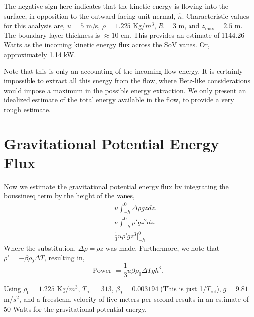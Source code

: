\documentclass{article}
\begin{document}

The negative sign here indicates that the kinetic energy is flowing into
the surface, in opposition to the outward facing unit normal, $\hat
n$. Characteristic values for this analysis are, $u = 5$ m/s, $\rho =
1.225$ Kg/$m^3$, $R = 3$ m, and $z_{\text{max}} = 2.5$ m. The boundary
layer thickness is $\approx 10$ cm. This provides
an estimate of 1144.26 Watts as the incoming kinetic energy flux across
the SoV vanes. Or, approximately 1.14 kW. 

Note that this is only an accounting of the incoming flow energy. It is certainly
impossible to extract all this energy from the flow, where Betz-like considerations 
would impose a maximum in the possible energy extraction. We only present an idealized
estimate of the total energy available in the flow, to provide a very rough estimate.


\section*{Gravitational Potential Energy Flux}


Now we estimate the gravitational potential energy flux by integrating 
the boussinesq term by the height of the vanes, 
\begin{align*}
  & = u \int_{-h}^0 \Delta \rho g z dz. \\
  & = u \int_{-h}^0 \rho' g z^2 dz. \\
  & = \frac{1}{3} u \rho' g z^3 \bigg|_{-h}^{0}
\end{align*}
Where the substitution, $\Delta \rho = \rho z$ was made. Furthermore, we
note that $\rho' = -\beta \rho_0 \Delta T$, resulting in, 
%
%
\begin{equation}
 \text{Power } = \frac{1}{3} u \beta \rho_0 \Delta T g h^3.
\end{equation}

Using $\rho_0 = 1.225$ Kg/$m^3$, $T_{\text{ref}}=313$, $\beta_T = 0.003194$
(This is just 1/$T_{\text{ref}}$), $g=9.81$ m/$s^2$, and a freesteam
velocity of five meters per second results in an
estimate of 50 Watts for the gravitational potential energy. 
\end{document}

